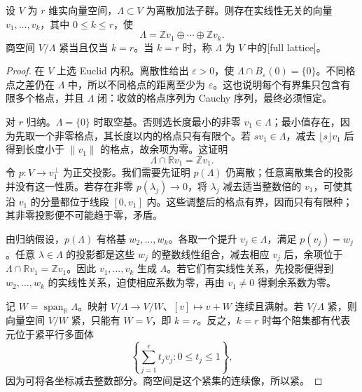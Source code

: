 \begin{lemma}\label{g1:lem:discrete-subgroup-lattice-basis}
	设 \(V\) 为 \(r\) 维实向量空间，\(\Lambda\subset V\) 为离散加法子群。则存在实线性无关的向量 \(v_1,\ldots,v_k\)，其中 \(0\le k\le r\)，使
	\[
		\Lambda=\mathbb Zv_1\oplus\cdots\oplus\mathbb Zv_k.
	\]
	商空间 \(V/\Lambda\) 紧当且仅当 \(k=r\)。当 \(k=r\) 时，称 \(\Lambda\) 为 \(V\) 中的[full lattice]。
\end{lemma}
\begin{proof}
	在 \(V\) 上选 Euclid 内积。离散性给出 \(\varepsilon>0\)，使 \(\Lambda\cap B_\varepsilon(0)=\{0\}\)。不同格点之差仍在 \(\Lambda\) 中，所以不同格点的距离至少为 \(\varepsilon\)。这也说明每个有界集只包含有限多个格点，并且 \(\Lambda\) 闭：收敛的格点序列为 Cauchy 序列，最终必须恒定。

	对 \(r\) 归纳。\(\Lambda=\{0\}\) 时取空基。否则选长度最小的非零 \(v_1\in\Lambda\)；最小值存在，因为先取一个非零格点，其长度以内的格点只有有限个。若 \(sv_1\in\Lambda\)，减去 \(\lfloor s\rfloor v_1\) 后得到长度小于 \(\lVert v_1\rVert\) 的格点，故余项为零。这证明
	\[
		\Lambda\cap\mathbb Rv_1=\mathbb Zv_1.
	\]
	令 \(p:V\to v_1^\perp\) 为正交投影。我们需要先证明 \(p(\Lambda)\) 仍离散；任意离散集合的投影并没有这一性质。若存在非零 \(p(\lambda_j)\to0\)，将 \(\lambda_j\) 减去适当整数倍的 \(v_1\)，可使其沿 \(v_1\) 的分量都位于线段 \([0,v_1]\) 内。这些调整后的格点有界，因而只有有限种；其非零投影便不可能趋于零，矛盾。

	由归纳假设，\(p(\Lambda)\) 有格基 \(w_2,\ldots,w_k\)。各取一个提升 \(v_j\in\Lambda\)，满足 \(p(v_j)=w_j\)。任意 \(\lambda\in\Lambda\) 的投影都是这些 \(w_j\) 的整数线性组合，减去相应 \(v_j\) 后，余项位于 \(\Lambda\cap\mathbb Rv_1=\mathbb Zv_1\)。因此 \(v_1,\ldots,v_k\) 生成 \(\Lambda\)。若它们有实线性关系，先投影便得到 \(w_2,\ldots,w_k\) 的实线性关系，迫使相应系数为零，再由 \(v_1\ne0\) 得剩余系数为零。

	记 \(W=\operatorname{span}_{\mathbb R}\Lambda\)。映射 \(V/\Lambda\to V/W\)、\([v]\mapsto v+W\) 连续且满射。若 \(V/\Lambda\) 紧，则向量空间 \(V/W\) 紧，只能有 \(W=V\)，即 \(k=r\)。反之，\(k=r\) 时每个陪集都有代表元位于紧平行多面体
	\[
		\left\{\sum_{j=1}^r t_jv_j:0\le t_j\le1\right\},
	\]
	因为可将各坐标减去整数部分。商空间是这个紧集的连续像，所以紧。
\end{proof}

